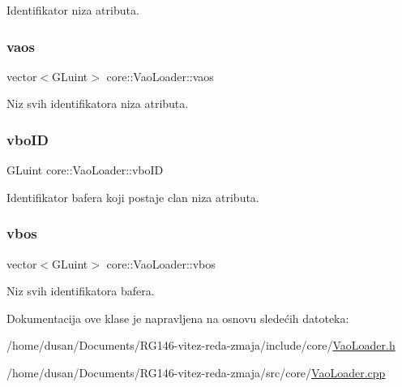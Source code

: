 Identifikator niza atributa. 

\mbox{\label{classcore_1_1VaoLoader_ad37e6f10d175e35a6fce4b9f76b559e2}} 
\subsubsection{\texorpdfstring{vaos}{vaos}}
{\footnotesize\ttfamily vector$<$G\+Luint$>$ core\+::\+Vao\+Loader\+::vaos\hspace{0.3cm}{\ttfamily [private]}}



Niz svih identifikatora niza atributa. 

\mbox{\label{classcore_1_1VaoLoader_a4bc8031f15ad1b7c7eff491f926b93e4}} 
\subsubsection{\texorpdfstring{vbo\+ID}{vboID}}
{\footnotesize\ttfamily G\+Luint core\+::\+Vao\+Loader\+::vbo\+ID\hspace{0.3cm}{\ttfamily [private]}}



Identifikator bafera koji postaje clan niza atributa. 

\mbox{\label{classcore_1_1VaoLoader_a8866245dbda8794e13956115557159a2}} 
\subsubsection{\texorpdfstring{vbos}{vbos}}
{\footnotesize\ttfamily vector$<$G\+Luint$>$ core\+::\+Vao\+Loader\+::vbos\hspace{0.3cm}{\ttfamily [private]}}



Niz svih identifikatora bafera. 



Dokumentacija ove klase je napravljena na osnovu sledećih datoteka\+:\begin{DoxyCompactItemize}
\item 
/home/dusan/\+Documents/\+R\+G146-\/vitez-\/reda-\/zmaja/include/core/\hyperlink{VaoLoader_8h}{Vao\+Loader.\+h}\item 
/home/dusan/\+Documents/\+R\+G146-\/vitez-\/reda-\/zmaja/src/core/\hyperlink{VaoLoader_8cpp}{Vao\+Loader.\+cpp}\end{DoxyCompactItemize}
